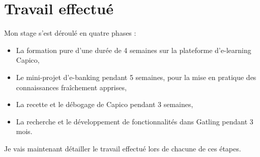\chapter{Travail effectué}

Mon stage s'est déroulé en quatre phases :

\begin{itemize}
	\item La formation pure d'une durée de 4 semaines sur la plateforme d'e-learning Capico,
	\item Le mini-projet d'e-banking pendant 5 semaines, pour la mise en pratique des connaissances fraîchement apprises,
	\item La recette et le débogage de Capico pendant 3 semaines,
	\item La recherche et le développement de fonctionnalités dans Gatling pendant 3 mois.\\
\end{itemize}

Je vais maintenant détailler le travail effectué lors de chacune de ces étapes.







